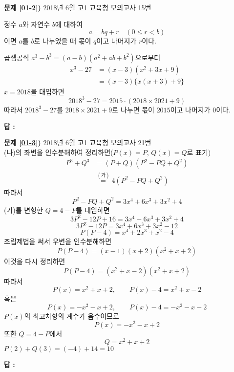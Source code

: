 \documentclass[a4paper]{oblivoir}
\newcommand\one{\ding{172}}
\newcommand\five{\ding{176}}
\newcommand\an[2]{\par\bigskip\noindent\textbf{문제 \ref{#1})} #2\\}
\newcommand\ans[1]{\begin{flushright}\textbf{답 : }#1\end{flushright}}
\begin{document}
%
\an{01-2}{2018년 6월 고1 교육청 모의고사 15번}
\begin{mdframed}
정수 \(a\)와 자연수 \(b\)에 대하여
\[a=bq+r\quad(0\le r<b)\]
이면 \(a\)를 \(b\)로 나누었을 때 몫이 \(q\)이고 나머지가 \(r\)이다.
\end{mdframed}
곱셈공식 \(a^3-b^3=(a-b)(a^2+ab+b^2)\)으로부터
\begin{align*}
x^3-27
&=(x-3)(x^2+3x+9)\\
&=(x-3)\{x(x+3)+9\}
\end{align*}
\(x=2018\)을 대입하면
\[2018^3-27=2015\cdot(2018\times2021+9)\]
따라서 \(2018^3-27\)를 \(2018\times2021+9\)로 나누면 몫이 \(2015\)이고 나머지가 \(0\)이다.
\ans{\one}

%
\an{01-3}{2018년 6월 고1 교육청 모의고사 21번}
(나)의 좌변을 인수분해하여 정리하면(\(P(x)=P\), \(Q(x)=Q\)로 표기)
\begin{align*}
P^3+Q^3
&=(P+Q)(P^2-PQ+Q^2)\\
&\stackrel{(가)}=4(P^2-PQ+Q^2)
\end{align*}
따라서
\[P^2-PQ+Q^2=3x^4+6x^3+3x^2+4\]
(가)를 변형한 \(Q=4-P\)를 대입하면
\[3P^2-12P+16=3x^4+6x^3+3x^2+4\]
\[3P^2-12P=3x^4+6x^3+3x^2-12\]
\[P(P-4)=x^4+2x^3+x^2-4\]
조립제법을 써서 우변을 인수분해하면
\[P(P-4)=(x-1)(x+2)(x^2+x+2)\]
이것을 다시 정리하면
\[P(P-4)=(x^2+x-2)(x^2+x+2)\]
따라서
\[P(x)=x^2+x+2,\qquad P(x)-4=x^2+x-2\]
혹은
\[P(x)=-x^2-x+2,\qquad P(x)-4=-x^2-x-2\]
\(P(x)\)의 최고차항의 계수가 음수이므로
\[P(x)=-x^2-x+2\]
또한 \(Q=4-P\)에서
\[Q=x^2+x+2\]
\(P(2)+Q(3)=(-4)+14=10\)
\ans{\five}


\end{document}
